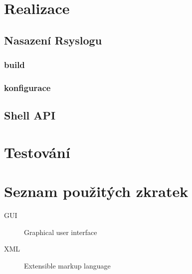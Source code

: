 \documentclass[thesis=B,czech]{FITthesis}[2012/06/26]
\begin{document}
\chapter{Realizace}

\section{Nasazení Rsyslogu}
\subsection*{build}
\subsection*{konfigurace}

\section{Shell API}

\chapter{Testování}

\begin{conclusion}

\end{conclusion}




\appendix

\chapter{Seznam použitých zkratek}
\begin{description}
	\item[GUI] Graphical user interface
	\item[XML] Extensible markup language
\end{description}
\end{document}
